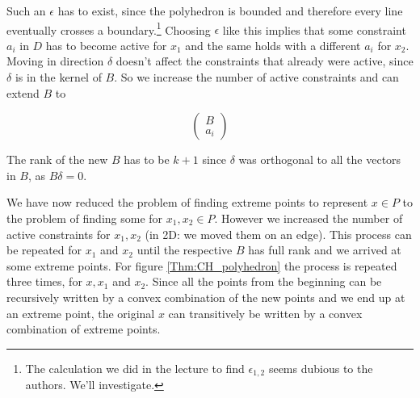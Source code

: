 \begin{pr}
\begin{description}
Such an $\epsilon$ has to exist, since the polyhedron is bounded and therefore every line eventually crosses a boundary.\footnote{The calculation we did in the lecture to find $\epsilon_{1,2}$ seems dubious to the authors. We'll investigate.} Choosing $\epsilon$ like this implies that some constraint $a_i$ in $D$ has to become active for $x_1$ and the same holds with a different $a_i$ for $x_2$. Moving in direction $\delta$ doesn't affect the constraints that already were active, since $\delta$ is in the kernel of $B$. So we increase the number of active constraints and can extend $B$ to 

\[\begin{pmatrix}B\\ a_i\end{pmatrix}\] 

The rank of the new $B$ has to be $k+1$ since $\delta$ was orthogonal to all the vectors in $B$, as $B\delta=0$. %

We have now reduced the problem of finding extreme points to represent $x \in P$ to the problem of finding some for $x_1,x_2 \in P$. However we increased the number of active constraints for $x_1,x_2$ (in 2D: we moved them on an edge). This process can be repeated for $x_1$ and $x_2$ until the respective $B$ has full rank and we arrived at some extreme points. For figure \ref{Thm:CH_polyhedron} the process is repeated three times, for $x,x_1$ and $x_2$. 
Since all the points from the beginning can be recursively written by a convex combination of the new points and we end up at an extreme point, the original $x$ can transitively be written by a convex combination of extreme points.
\end{description}

%




\end{pr}

